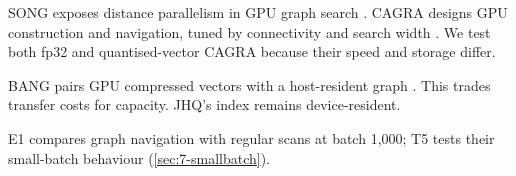 SONG exposes distance parallelism in GPU graph search \cite{song}. CAGRA designs GPU construction and navigation, tuned by connectivity and search width \cite{cagra}. We test both fp32 and quantised-vector CAGRA because their speed and storage differ.

BANG pairs GPU compressed vectors with a host-resident graph \cite{bang}. This trades transfer costs for capacity. JHQ's index remains device-resident.

E1 compares graph navigation with regular scans at batch 1,000; T5 tests their small-batch behaviour (\cref{sec:7-smallbatch}).